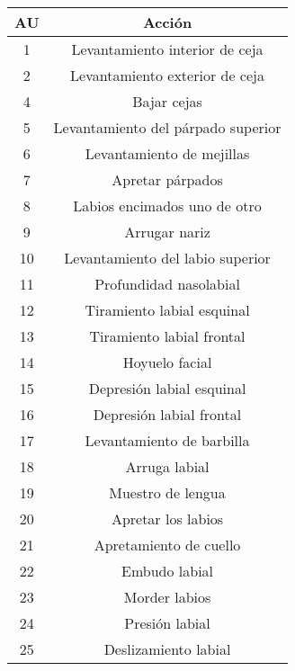 \begin{table}[H]
\centering
\begin{tabular}{|c|c|}
\hline
\textbf{AU} & \textbf{Acción} \\ \hline
1             & Levantamiento interior de ceja      \\ \hline
2             & Levantamiento exterior de ceja      \\ \hline
4             & Bajar cejas                         \\ \hline
5             & Levantamiento del párpado superior  \\ \hline
6             & Levantamiento de mejillas           \\ \hline
7             & Apretar párpados                    \\ \hline
8             & Labios encimados uno de otro        \\ \hline
9             & Arrugar nariz                       \\ \hline
10            & Levantamiento del labio superior    \\ \hline
11            & Profundidad nasolabial              \\ \hline
12            & Tiramiento labial esquinal          \\ \hline
13            & Tiramiento labial frontal           \\ \hline
14            & Hoyuelo facial                      \\ \hline
15            & Depresión labial esquinal           \\ \hline
16            & Depresión labial frontal            \\ \hline
17            & Levantamiento de barbilla           \\ \hline
18            & Arruga labial                       \\ \hline
19            & Muestro de lengua                   \\ \hline
20            & Apretar los labios                  \\ \hline
21            & Apretamiento de cuello              \\ \hline
22            & Embudo labial                       \\ \hline
23            & Morder labios                       \\ \hline
24            & Presión labial                      \\ \hline
25            & Deslizamiento labial                \\ \hline

\end{tabular}
\end{table}
